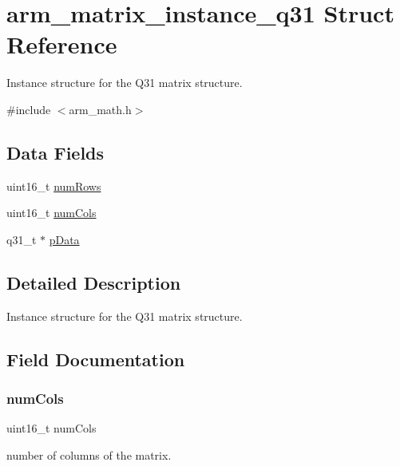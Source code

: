 \hypertarget{structarm__matrix__instance__q31}{}\section{arm\+\_\+matrix\+\_\+instance\+\_\+q31 Struct Reference}
\label{structarm__matrix__instance__q31}


Instance structure for the Q31 matrix structure.  




{\ttfamily \#include $<$arm\+\_\+math.\+h$>$}

\subsection*{Data Fields}
\begin{DoxyCompactItemize}
\item 
uint16\+\_\+t \mbox{\hyperlink{structarm__matrix__instance__q31_a1bcf80ccdc2acc29198f1592ae300390}{num\+Rows}}
\item 
uint16\+\_\+t \mbox{\hyperlink{structarm__matrix__instance__q31_a4bb5ec0d13eb4c9cf887aa8366a44117}{num\+Cols}}
\item 
q31\+\_\+t $\ast$ \mbox{\hyperlink{structarm__matrix__instance__q31_ad296f76577326ff280726323536eed6d}{p\+Data}}
\end{DoxyCompactItemize}


\subsection{Detailed Description}
Instance structure for the Q31 matrix structure. 

\subsection{Field Documentation}
\mbox{\label{structarm__matrix__instance__q31_a4bb5ec0d13eb4c9cf887aa8366a44117}} 
\subsubsection{\texorpdfstring{numCols}{numCols}}
{\footnotesize\ttfamily uint16\+\_\+t num\+Cols}

number of columns of the matrix. \mbox{\label{structarm__matrix__instance__q31_a1bcf80ccdc2acc29198f1592ae300390}} 
